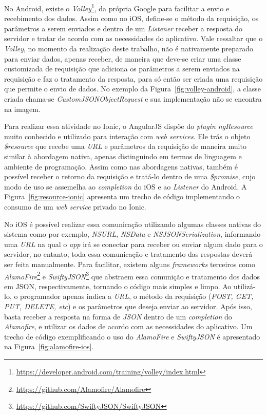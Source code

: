 No Android, existe o \textit{Volley}\footnote{\url{https://developer.android.com/training/volley/index.html}}, da própria Google para facilitar a envio e recebimento dos dados. Assim como no iOS, define-se o método da 
requisição, os parâmetros a serem enviados e dentro de um \textit{Listener} receber a resposta do servidor e tratar de acordo com as necessidades do aplicativo. Vale ressaltar que o \textit{Volley}, no momento da realização
deste trabalho, não é nativamente preparado para enviar dados, apenas receber, de maneira que deve-se criar uma classe customizada de requisição que adiciona os parâmetros a serem enviados na requisição e faz o tratamento da
resposta, para só então ser criada uma requisição que permite o envio de dados. No exemplo da Figura~\ref{fig:volley-android}, a classe criada chama-se \textit{CustomJSONObjectRequest} e sua implementação não se encontra 
na imagem.

Para realizar essa atividade no Ionic, o AngularJS dispõe do \textit{plugin ngResource} muito conhecido e utilizado para interação com \textit{web services}. Ele trás o objeto \textit{\$resource} que recebe uma 
\textit{URL} e parâmetros da requisição de maneira muito similar à abordagem nativa, apenas distinguindo em termos de linguagem e ambiente de programação. Assim como nas abordagens nativas, também é possível receber 
o retorno da requisição e tratá-lo dentro de uma \textit{\$promise}, cujo modo de uso se assemelha ao \textit{completion} do iOS e ao \textit{Listener} do Android. A Figura~\ref{fig:resource-ionic} apresenta um trecho 
de código implementando o consumo de um \textit{web service} privado no Ionic.

No iOS é possível realizar essa comunicação utilizando algumas classes nativas do sistema como por exemplo, \textit{NSURL}, \textit{NSData} e \textit{NSJSONSerialization}, informando uma \textit{URL} 
na qual o \textit{app} irá se conectar para receber ou enviar algum dado para o servidor, no entanto, toda essa comunicação e tratamento das respostas deverá ser feita manualmente. Para facilitar, existem alguns 
\textit{frameworks} terceiros como \textit{AlamoFire}\footnote{\url{https://github.com/Alamofire/Alamofire}} e \textit{SwiftyJSON}\footnote{\url{https://github.com/SwiftyJSON/SwiftyJSON}} 
que abstraem essa comunição e tratamento dos dados em JSON, respectivamente, tornando o código mais simples e limpo. Ao utilizá-lo, o programador apenas indica a \textit{URL}, o método da requisição 
(\textit{POST, GET, PUT, DELETE, etc}) e os parâmetros que deseja enviar ao servidor. Após isso, basta receber a resposta na forma de \textit{JSON} dentro de um \textit{completion} do \textit{Alamofire}, 
e utilizar os dados de acordo com as necessidades do aplicativo. Um trecho de código exemplificando o uso do \textit{AlamoFire} e \textit{SwiftyJSON} é apresentado na Figura~\ref{fig:alamofire-ios}.

